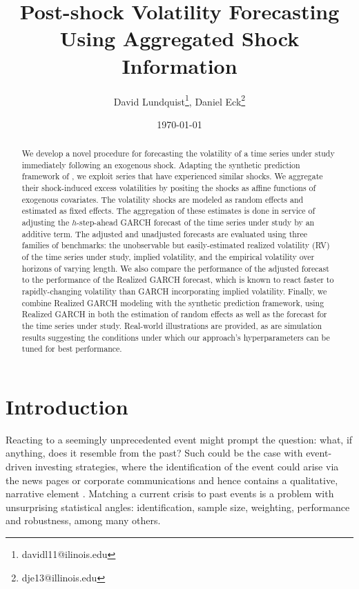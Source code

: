\documentclass[11pt]{article}
\title{Post-shock Volatility Forecasting Using Aggregated Shock Information}
\author{David Lundquist\thanks{davidl11@ilinois.edu}, Daniel Eck\thanks{dje13@illinois.edu} }
\affil{Department of Statistics, University of Illinois at Urbana-Champaign}
\date{\today}
\theoremstyle{definition}
\begin{document}
\maketitle

\begin{abstract} 
We develop a novel procedure for forecasting the volatility of a time series under study immediately following an exogenous shock.  Adapting the synthetic prediction framework of \citet{lin2021minimizing}, we exploit series that have experienced similar shocks.  We aggregate their shock-induced excess volatilities by positing the shocks as affine functions of exogenous covariates.  The volatility shocks are modeled as random effects and estimated as fixed effects.  The aggregation of these estimates is done in service of adjusting the $h$-step-ahead GARCH forecast of the time series under study by an additive term.  The adjusted and unadjusted forecasts are evaluated using three families of benchmarks: the unobservable but easily-estimated realized volatility (RV) of the time series under study, implied volatility, and the empirical volatility over horizons of varying length.  We also compare the performance of the adjusted forecast to the performance of the Realized GARCH forecast, which is known to react faster to rapidly-changing volatility than GARCH incorporating implied volatility.   Finally, we combine Realized GARCH modeling with the synthetic prediction framework, using Realized GARCH in both the estimation of random effects as well as the forecast for the time series under study.  Real-world illustrations are provided, as are simulation results suggesting the conditions under which our approach's hyperparameters can be tuned for best performance.
\end{abstract}

\section{Introduction}

Reacting to a seemingly unprecedented event might prompt the question: what, if anything, does it resemble from the past?  Such could be the case with event-driven investing strategies, where the identification of the event could arise via the news pages or corporate communications and hence contains a qualitative, narrative element \citep{Kenton}.  Matching a current crisis to past events is a problem with unsurprising statistical angles: identification, sample size, weighting, performance and robustness, among many others.  
\end{document}
